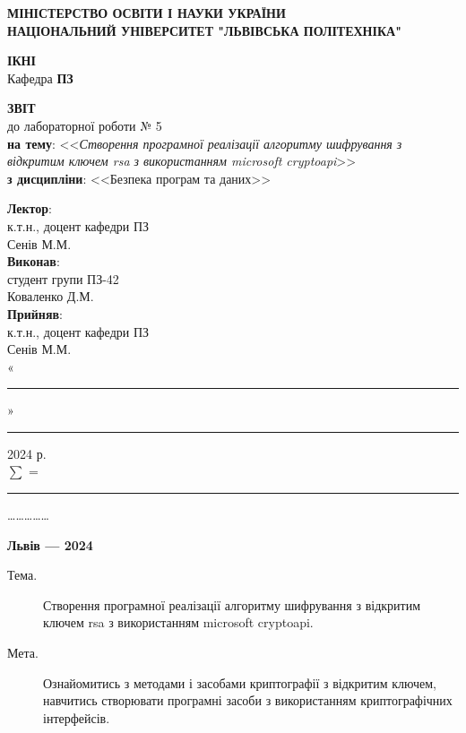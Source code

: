 \documentclass[oneside,14pt]{extarticle}
\newcommand\subject{Безпека програм та даних}
\newcommand\lecturer{к.т.н., доцент кафедри ПЗ\\Сенів М.М.}
\newcommand\teacher{к.т.н., доцент кафедри ПЗ\\Сенів М.М.}
\newcommand\mygroup{ПЗ-42}
\newcommand\lab{5}
\newcommand\theme{Створення програмної реалізації алгоритму шифрування з відкритим ключем rsa з використанням microsoft cryptoapi}
\newcommand\purpose{Ознайомитись з методами і засобами криптографії з
	відкритим ключем, навчитись створювати програмні засоби з використанням
	криптографічних інтерфейсів}
\begin{document}
\begin{normalsize}
	\begin{titlepage}
		\thispagestyle{empty}
		\begin{center}
			\textbf{МІНІСТЕРСТВО ОСВІТИ І НАУКИ УКРАЇНИ\\
				НАЦІОНАЛЬНИЙ УНІВЕРСИТЕТ "ЛЬВІВСЬКА ПОЛІТЕХНІКА"}
		\end{center}
		\begin{flushright}
			\textbf{ІКНІ}\\
			Кафедра \textbf{ПЗ}
		\end{flushright}
		\vspace{80pt}
		\begin{center}
			\textbf{ЗВІТ}\\
			\vspace{10pt}
			до лабораторної роботи № \lab\\
			\textbf{на тему}: <<\textit{\theme}>>\\
			\textbf{з дисципліни}: <<\subject>>
		\end{center}
		\vspace{80pt}
		\begin{flushright}
			
			\textbf{Лектор}:\\
			\lecturer\\
			\vspace{28pt}
			\textbf{Виконав}:\\
			
			студент групи \mygroup\\
			Коваленко Д.М.\\
			\vspace{28pt}
			\textbf{Прийняв}:\\
			
			\teacher\\
			
			\vspace{28pt}
			«\rule{1cm}{0.15mm}» \rule{1.5cm}{0.15mm} 2024 р.\\
			$\sum$ = \rule{1cm}{0.15mm}……………\\
			
		\end{flushright}
		\vspace{\fill}
		\begin{center}
			\textbf{Львів — 2024}
		\end{center}
	\end{titlepage}
		
	\begin{description}
		\item[Тема.] \theme.
		\item[Мета.] \purpose.
	\end{description}


\end{normalsize}
\end{document}
